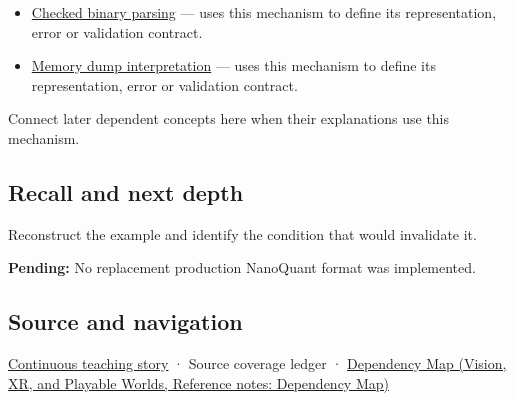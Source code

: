 \hypertarget{appendix-590bbb2424c1-used-by}{}

\begin{itemize}
\tightlist
\item
  \hyperref[appendix-652d81568de9]{Checked binary parsing} --- uses this mechanism to define its representation, error or validation contract.
\item
  \hyperref[appendix-230b59c0676b]{Memory dump interpretation} --- uses this mechanism to define its representation, error or validation contract.
\end{itemize}

Connect later dependent concepts here when their explanations use this mechanism.

\subsection{Recall and next depth}\label{appendix-590bbb2424c1-recall-and-next-depth}

\hypertarget{appendix-590bbb2424c1-recall-and-next-depth}{}

Reconstruct the example and identify the condition that would invalidate it.

\textbf{Pending:} No replacement production NanoQuant format was implemented.

\subsection{Source and navigation}\label{appendix-590bbb2424c1-source-and-navigation}

\hypertarget{appendix-590bbb2424c1-source-and-navigation}{}

\hyperref[01-foundations-i-ch002-bytes-become-a-durable-agreement]{Continuous teaching story} · {Source coverage ledger} · \href{../07-Vision-XR-and-Playable-Worlds/main.pdf\#nameddest=appendix-4ad47bdd269a}{Dependency Map (Vision, XR, and Playable Worlds, Reference notes: Dependency Map)}
